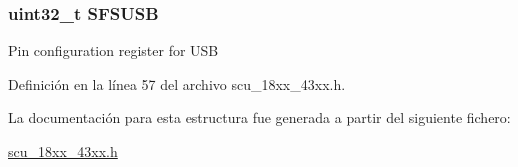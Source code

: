 \subsubsection[{\texorpdfstring{S\+F\+S\+U\+SB}{SFSUSB}}]{ uint32\+\_\+t S\+F\+S\+U\+SB}\hypertarget{struct_l_p_c___s_c_u___t_aac42eb6179225f3d3326db08215aa1c3}{}\label{struct_l_p_c___s_c_u___t_aac42eb6179225f3d3326db08215aa1c3}
Pin configuration register for U\+SB 

Definición en la línea 57 del archivo scu\+\_\+18xx\+\_\+43xx.\+h.



La documentación para esta estructura fue generada a partir del siguiente fichero\+:\begin{DoxyCompactItemize}
\item 
\hyperlink{scu__18xx__43xx_8h}{scu\+\_\+18xx\+\_\+43xx.\+h}\end{DoxyCompactItemize}
